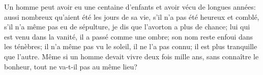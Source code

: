 Un homme peut avoir eu une centaine d’enfants et avoir vécu de longues années:
	aussi nombreux qu’aient été les jours de sa vie,
	s’il n’a pas été heureux et comblé, s’il n’a même pas eu de sépulture,
	je dis que l’avorton a plus de chance;
	lui qui est venu dans la vanité, il a passé comme une ombre;
	son nom reste enfoui dans les ténèbres;
	il n’a même pas vu le soleil, il ne l’a pas connu;
	il est plus tranquille que l’autre.
Même si un homme devait vivre deux fois mille ans, sans connaître le bonheur,
	tout ne va-t-il pas au même lieu?
